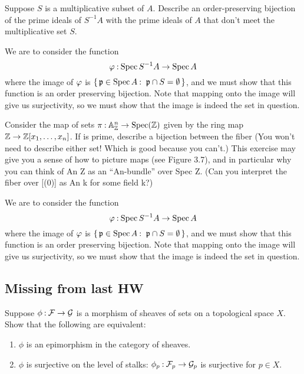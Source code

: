 \documentclass[12pt]{memoir}
\begin{document}
\begin{Ej}[3.2.K Vakil]
    Suppose $S$ is a multiplicative subset of $A$. Describe an order-preserving bijection of the prime ideals of $S^{-1}A$ with the prime ideals of $A$ that don't meet the multiplicative set $S$.
\end{Ej}

\begin{ptcbr}
    We are to consider the function 
    $$\varphi\mathbin{:}\operatorname{Spec} S^{-1}A\to\operatorname{Spec} A$$
    where the image of $\varphi$ is $\{\,\mathfrak{p}\in\operatorname{Spec} A\mathbin{:}\ \mathfrak{p}\cap S=\emptyset\,\}$, and we must show that this function is an order preserving bijection. Note that mapping onto the image will give us surjectivity, so we must show that the image is indeed the set in question. 
\end{ptcbr}

\begin{Ej}[3.2.Q Vakil]
    Consider the map of sets $\pi\mathbin{:}\mathbb{A}^n_{\mathbb{Z}}\to\operatorname{Spec}(\mathbb{Z})$
given by the ring map $\mathbb{Z}\to\mathbb{Z}[x_1,\dots,x_n]$. If  is prime, describe a bijection between the fiber  (You won’t need to describe either set! Which is good
because you can’t.) This exercise may give you a sense of how to picture maps (see Figure 3.7), and in particular why you can think of An Z as an “An-bundle” over Spec Z. (Can you interpret the fiber over [(0)] as An
k for some field k?)

\end{Ej}

\begin{ptcbr}
    We are to consider the function 
    $$\varphi\mathbin{:}\operatorname{Spec} S^{-1}A\to\operatorname{Spec} A$$
    where the image of $\varphi$ is $\{\,\mathfrak{p}\in\operatorname{Spec} A\mathbin{:}\ \mathfrak{p}\cap S=\emptyset\,\}$, and we must show that this function is an order preserving bijection. Note that mapping onto the image will give us surjectivity, so we must show that the image is indeed the set in question. 
\end{ptcbr}
\subsection{Missing from last HW}

\begin{Ej}
    Suppose $\phi\mathbin{:}\mathcal{F}\to\mathcal{G}$ is a morphism of sheaves of sets on a topological space $X$. Show that the following are equivalent:
\begin{enumerate}
    \item $\phi$ is an epimorphism in the category of sheaves. 
    \item $\phi$ is surjective on the level of stalks: $\phi_p\mathbin{:}\mathcal{F}_p\to\mathcal{G}_p$ is surjective for $p\in X$.
\end{enumerate}
\end{Ej}
\end{document}
